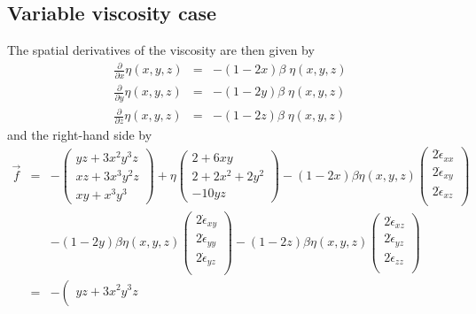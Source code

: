 \subsection{Variable viscosity case}

The spatial derivatives of the viscosity are then given by
\begin{eqnarray}
\frac{\partial }{\partial x} \eta(x,y,z) &=& -(1-2x)\beta\; \eta(x,y,z) \nonumber\\
\frac{\partial }{\partial y} \eta(x,y,z) &=& -(1-2y)\beta\; \eta(x,y,z) \nonumber\\
\frac{\partial }{\partial z} \eta(x,y,z) &=& -(1-2z)\beta\; \eta(x,y,z) \nonumber
\end{eqnarray}
and the right-hand side by
\begin{eqnarray}
\vec{f} 
&=& 
-
\left(
\begin{array}{c}
yz+3x^2y^3z\\
xz +3x^3y^2z \\
xy+x^3y^3
\end{array}
\right)
+\eta
\left(
\begin{array}{c}
2+6xy  \\
2 + 2x^2 +  2y^2 \\
-10yz 
\end{array}
\right) 
-(1-2x)\beta \eta (x,y,z)
\left(
\begin{array}{c}
2\dot{\epsilon}_{xx} \\
2\dot{\epsilon}_{xy} \\
2\dot{\epsilon}_{xz} \\
\end{array}
\right) \\
&&
-(1-2y)\beta \eta (x,y,z)
\left(
\begin{array}{c}
2\dot{\epsilon}_{xy} \\
2\dot{\epsilon}_{yy} \\
2\dot{\epsilon}_{yz} \\
\end{array}
\right)
-(1-2z)\beta \eta (x,y,z)
\left(
\begin{array}{c}
2\dot{\epsilon}_{xz} \\
2\dot{\epsilon}_{yz} \\
2\dot{\epsilon}_{zz} \\
\end{array}
\right) \nonumber\\
&=& 
-
\left(
\begin{array}{c}
yz+3x^2y^3z\\

\end{array}
\end{eqnarray}
